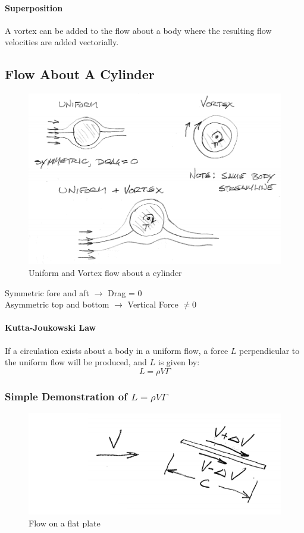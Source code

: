 \documentclass[draft=false, titlepage]{article}
\begin{document}
\paragraph*{Superposition} A vortex can be added to the flow about a body where the resulting flow velocities are added vectorially.

\subsection{Flow About A Cylinder}
\begin{figure}[ht]
	\centering
	\includegraphics[width=0.8\linewidth]{Figures/p29_flowOnCylinder.PNG}
	\caption{Uniform and Vortex flow about a cylinder}
	\label{fig:p29_flowOnCylinder}
\end{figure}
Symmetric fore and aft $\rightarrow$ Drag = 0\\
Asymmetric top and bottom $\rightarrow$ Vertical Force $\neq 0$
\paragraph*{Kutta-Joukowski Law} If a circulation exists about a body in a uniform flow, a force $L$ perpendicular to the uniform flow will be produced, and $L$ is given by:
\begin{equation}
L = \rho V \Gamma
\end{equation}

\subsubsection{Simple Demonstration of $L=\rho V\Gamma$}
\begin{figure}[ht]
	\centering
	\includegraphics[width=0.4\linewidth]{Figures/p30_flatPlate.PNG}
	\caption{Flow on a flat plate}
	\label{fig:p30_flatPlate}
\end{figure}
\end{document}
